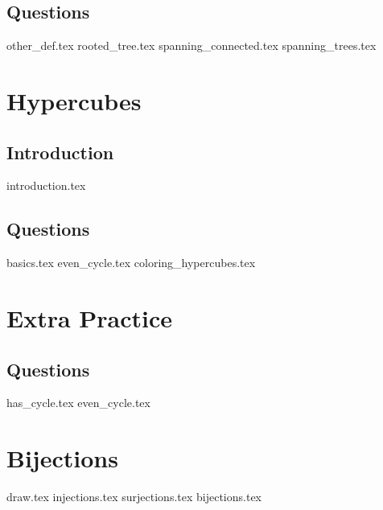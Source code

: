 \documentclass{exam}
\begin{document}
\subsection{Questions}
\begin{questions}
{other_def.tex}
{rooted_tree.tex}
{spanning_connected.tex}
{spanning_trees.tex}
\end{questions}

\section{Hypercubes}
\subsection{Introduction}
{introduction.tex}
\subsection{Questions}
\begin{questions}
{basics.tex}
{even_cycle.tex}
{coloring_hypercubes.tex}
\end{questions}

\section{Extra Practice}
\subsection{Questions}
\begin{questions}
{has_cycle.tex}
{even_cycle.tex}
\end{questions}

\section{Bijections}
\begin{questions}
	{draw.tex}
	{injections.tex}
	{surjections.tex}
	{bijections.tex}
\end{questions}
\end{document}
